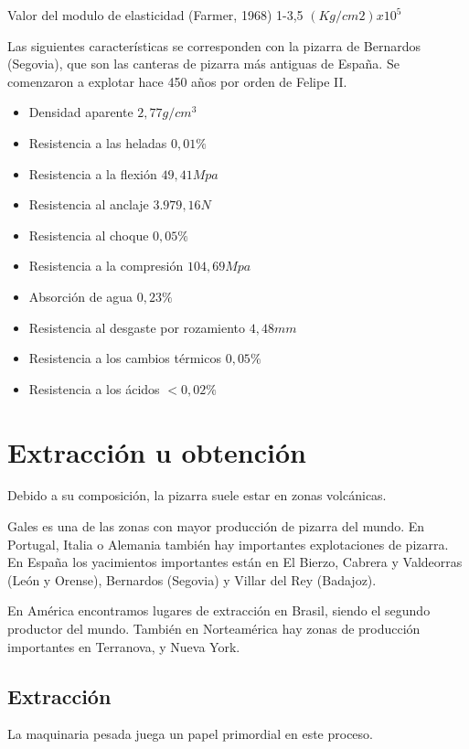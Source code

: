 Valor del modulo de elasticidad (Farmer, 1968) 1-3,5 $(Kg/cm2) x 10^5$
\par
Las siguientes características se corresponden con la pizarra de Bernardos (Segovia), que son las canteras de pizarra más antiguas de España. Se comenzaron a explotar hace 450 años por orden de Felipe II.

 \begin{itemize}
        \item Densidad aparente $2,77 g/cm^3$ 
	\item Resistencia a las heladas $0,01\%$
	\item Resistencia a la flexión $49,41 Mpa$
	\item Resistencia al anclaje $3.979,16 N$
	\item Resistencia al choque $0,05\%$
	\item Resistencia a la compresión $104,69 Mpa$
	\item Absorción de agua $0,23\%$
	\item Resistencia al desgaste por rozamiento $4,48 mm$
	\item Resistencia a los cambios térmicos $0,05\%$
	\item Resistencia a los ácidos $<0,02\%$
   \end{itemize}

\clearpage

\section {Extracción u obtención}
Debido a su composición, la pizarra suele estar en zonas volcánicas.

Gales es una de las zonas con mayor producción de pizarra del mundo. En Portugal, Italia o Alemania también hay importantes explotaciones de pizarra. En España los yacimientos importantes están en El Bierzo,
Cabrera y Valdeorras (León y Orense), Bernardos (Segovia) y Villar del Rey (Badajoz).

En América encontramos lugares de extracción en Brasil, siendo el segundo productor del mundo. También en Norteamérica hay zonas de producción importantes en Terranova, y Nueva York.

	\subsection {Extracción}

La maquinaria pesada juega un papel primordial en este proceso.


